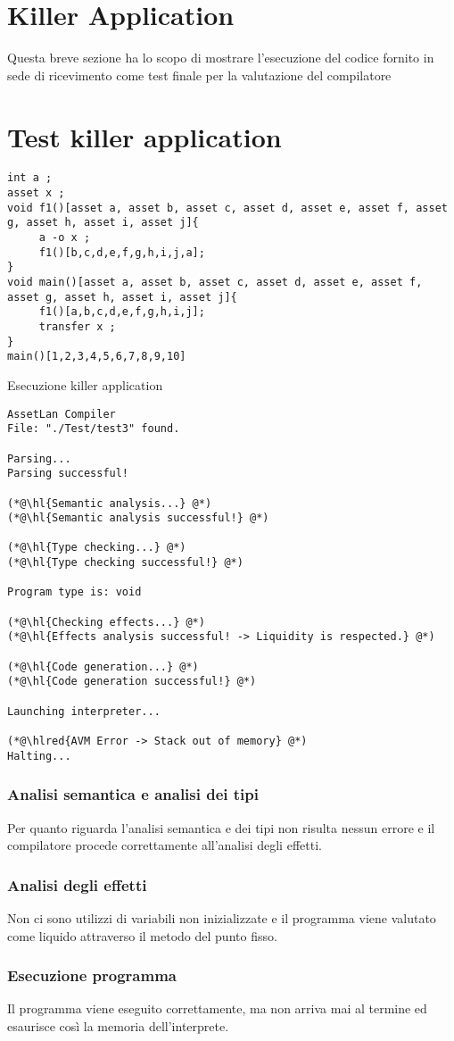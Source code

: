 \documentclass[12pt,twoside,openright,a4paper]{report}
\DeclareRobustCommand{\hlred}[1]{{\sethlcolor{red}\hl{#1}}}
\begin{document}
\newpage
\section{Killer Application}
Questa breve sezione ha lo scopo di mostrare l'esecuzione del codice fornito in sede di ricevimento come test finale per la valutazione del compilatore

\section{Test killer application}

\begin{lstlisting}
int a ;
asset x ;
void f1()[asset a, asset b, asset c, asset d, asset e, asset f, asset g, asset h, asset i, asset j]{
     a -o x ;
     f1()[b,c,d,e,f,g,h,i,j,a];
}
void main()[asset a, asset b, asset c, asset d, asset e, asset f, asset g, asset h, asset i, asset j]{
     f1()[a,b,c,d,e,f,g,h,i,j];
     transfer x ;
}
main()[1,2,3,4,5,6,7,8,9,10]
\end{lstlisting}

Esecuzione killer application
\begin{lstlisting}
AssetLan Compiler
File: "./Test/test3" found.

Parsing...
Parsing successful!

(*@\hl{Semantic analysis...} @*)
(*@\hl{Semantic analysis successful!} @*)

(*@\hl{Type checking...} @*)
(*@\hl{Type checking successful!} @*)

Program type is: void

(*@\hl{Checking effects...} @*)
(*@\hl{Effects analysis successful! -> Liquidity is respected.} @*)

(*@\hl{Code generation...} @*)
(*@\hl{Code generation successful!} @*)

Launching interpreter...

(*@\hlred{AVM Error -> Stack out of memory} @*)
Halting...
\end{lstlisting}

\subsubsection{Analisi semantica e analisi dei tipi}
Per quanto riguarda l'analisi semantica e dei tipi non risulta nessun errore e il compilatore procede correttamente all'analisi degli effetti.

\subsubsection{Analisi degli effetti}
Non ci sono utilizzi di variabili non inizializzate e il programma viene valutato come liquido attraverso il metodo del punto fisso.

\subsubsection{Esecuzione programma}
Il programma viene eseguito correttamente, ma non arriva mai al termine ed esaurisce così la memoria dell'interprete.
\end{document}
